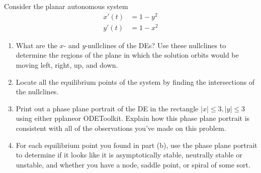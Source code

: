 \documentclass[12pt,letterpaper]{hmcpset}
\begin{document}

\begin{problem}[1]
    Consider the planar autonomous system 
    \begin{align*}
        x'(t)&=1-y^2\\
        y'(t)&=1-x^2
    \end{align*}
    \begin{enumerate}
        \item What are the $x$- and $y$-nullclines of the DEs?  Use
            these nullclines to determine the regions of the plane in
            which the solution orbits would be moving left, right, up,
            and down.
        \item Locate all the equilibrium points of the system by
            finding the intersections of the nullclines.
        \item Print out a phase plane portrait of the DE in the
            rectangle $|x|\leq3,|y|\leq3$ using either
            pplane\footnotemark or ODEToolkit\footnotemark.
            Explain how this phase plane portrait is consistent with all
            of the observations you've made on this problem.
        \item For each equilibrium point you found in part (b), use
            the phase plane portrait to determine if it looks like it is
            asymptotically stable, neutrally stable or unstable, and
            whether you have a node, saddle point, or spiral of some
            sort.
    \end{enumerate}
\end{problem}
\begin{solution}
    \vfill
\end{solution}
\newpage
\end{document}
